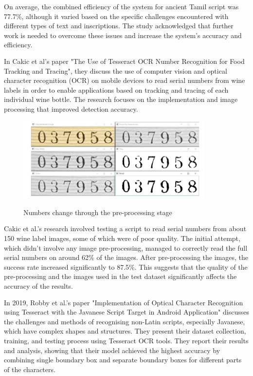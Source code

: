 On average, the combined efficiency of the system for ancient Tamil script was 77.7\%, although it varied based on the specific challenges encountered with different types of text and inscriptions. The study acknowledged that further work is needed to overcome these issues and increase the system's accuracy and efficiency.\cite{giridharNovelApproachOCR2019}

In Cakic et al's paper "The Use of Tesseract OCR Number Recognition for Food Tracking and Tracing", they discuss the use of computer vision and optical character recognition (OCR) on mobile devices to read serial numbers from wine labels in order to enable applications based on tracking and tracing of each individual wine bottle. The research focuses on the implementation and image processing that improved detection accuracy.

\begin{figure}[ht]
    \centering
    \includegraphics[width=0.88\textwidth]{Figures/tesseract_papers/Cakic_2020.jpg}
    \caption[Numbers change through the pre-processing stage]{Numbers change through the pre-processing stage}\cite{cakicUseTesseractOCR2020}
    \label{fig:Cakic's Numbers change through the preprocessing stage}
\end{figure}

Cakic et al.'s research involved testing a script to read serial numbers from about 150 wine label images, some of which were of poor quality. The initial attempt, which didn't involve any image pre-processing, managed to correctly read the full serial numbers on around 62\% of the images. After pre-processing the images, the success rate increased significantly to 87.5\%. This suggests that the quality of the pre-processing and the images used in the test dataset significantly affects the accuracy of the results.

In 2019, Robby et al.'s paper "Implementation of Optical Character Recognition using Tesseract with the Javanese Script Target in Android Application" discusses the challenges and methods of recognising non-Latin scripts, especially Javanese, which have complex shapes and structures. They present their dataset collection, training, and testing process using Tesseract OCR tools. They report their results and analysis, showing that their model achieved the highest accuracy by combining single boundary box and separate boundary boxes for different parts of the characters.

